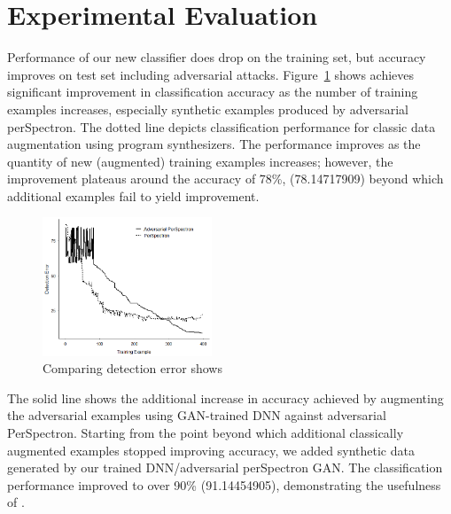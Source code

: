 \section{Experimental Evaluation}\label{results}












 Performance of our new classifier does drop on the training set, but accuracy improves on test set including adversarial attacks. Figure~\ref{fig:accuracy} shows \scheme achieves significant improvement in classification accuracy as the number of training examples increases, especially synthetic examples produced by adversarial perSpectron. The dotted line depicts classification performance for classic data augmentation using program synthesizers. The performance improves as the quantity of new (augmented) training examples increases; however, the improvement plateaus around the accuracy of 78\%, (78.14717909)
 beyond which additional examples fail to yield improvement.
 
\begin{figure}[ht!] 
\centering
\includegraphics[width=0.45\textwidth]{PerSpectron-Micro2020-camera-R/img/adverse7.png}
\vspace*{-4mm}
\caption{Comparing detection error shows 
  \scheme{} 
}
\label{fig:accuracy}
\end{figure}

The solid line shows the additional increase in accuracy achieved by augmenting the adversarial examples using GAN-trained DNN against adversarial PerSpectron. Starting from the point beyond which additional classically augmented examples stopped improving accuracy, we added synthetic data generated by our trained DNN/adversarial perSpectron GAN. The classification performance improved to over 90\% (91.14454905), demonstrating the usefulness of \scheme. 

